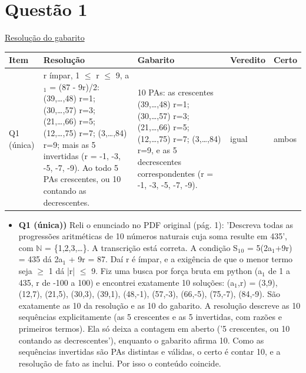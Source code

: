 \documentclass{article}%
\begin{document}
\begin{longtable}{@{}c c p{}@{}}
$$10 & 10,0 & A resolução está correta e concorda com o gabarito do Poliedro: k = 3. No 1º quadrante, f percorre ($\surd$2-1, 2-$\surd$2{]}, intervalo sem inteiros. No 3º quadrante, percorre ($\surd$2+1, 2+$\surd$2{]}, que contém só o inteiro 3. Confirmei isso numericamente e conferi que o x explícito dado na resolução ($\approx$ 3,429 rad, no 3º quadrante) dá f(x) = 3. A resolução é até mais cuidadosa que o gabarito: usa os módulos corretamente, justifica por continuidade que todos os valores do intervalo são atingidos e trata o caso dos pontos sobre os eixos. O gabarito só tem pequenas imprecisões de redação, como a falta dos módulos numa linha intermediária e a mistura de desigualdades estritas e não estritas, que não afetam a resposta. \\
\bottomrule\end{longtable}%
\section*{Questão 1}%
\href{https://poliedroresolve.sistemapoliedro.com.br/vestibulares/ita/2027/ita-2-fase-dia-1-20-10-2026-2-fase-dia-1/dissertativa-1-matematica-2-fase-dia-1-ita-2027}{Resolução do gabarito}\par\smallskip%
\begin{longtable}{@{}p{} p{} p{} p{} p{}@{}}\toprule Item & Resolução & Gabarito & Veredito & Certo \\ \midrule
Q1 (única) & r ímpar, 1 $\leq$ r $\leq$ 9, a$_{1}$ = (87 - 9r)/2: (39,\ldots{},48) r=1; (30,\ldots{},57) r=3; (21,\ldots{},66) r=5; (12,\ldots{},75) r=7; (3,\ldots{},84) r=9; mais as 5 invertidas (r = -1, -3, -5, -7, -9). Ao todo 5 PAs crescentes, ou 10 contando as decrescentes. & 10 PAs: as crescentes (39,\ldots{},48) r=1; (30,\ldots{},57) r=3; (21,\ldots{},66) r=5; (12,\ldots{},75) r=7; (3,\ldots{},84) r=9, e as 5 decrescentes correspondentes (r = -1, -3, -5, -7, -9). & igual & ambos \\
\bottomrule\end{longtable}%
\begin{itemize}%
\item%
\textbf{Q1 (única))} Reli o enunciado no PDF original (pág. 1): 'Descreva todas as progressões aritméticas de 10 números naturais cuja soma resulte em 435', com $\mathbb{N}$ = \{1,2,3,\ldots{}\}. A transcrição está correta. A condição S$_{1}$$_{0}$ = 5(2a$_{1}$+9r) = 435 dá 2a$_{1}$ + 9r = 87. Daí r é ímpar, e a exigência de que o menor termo seja $\geq$ 1 dá |r| $\leq$ 9. Fiz uma busca por força bruta em python (a$_{1}$ de 1 a 435, r de -100 a 100) e encontrei exatamente 10 soluções: (a$_{1}$,r) = (3,9), (12,7), (21,5), (30,3), (39,1), (48,-1), (57,-3), (66,-5), (75,-7), (84,-9). São exatamente as 10 da resolução e as 10 do gabarito. A resolução descreve as 10 sequências explicitamente (as 5 crescentes e as 5 invertidas, com razões e primeiros termos). Ela só deixa a contagem em aberto ('5 crescentes, ou 10 contando as decrescentes'), enquanto o gabarito afirma 10. Como as sequências invertidas são PAs distintas e válidas, o certo é contar 10, e a resolução de fato as inclui. Por isso o conteúdo coincide.%
\end{itemize}%
\end{document}
